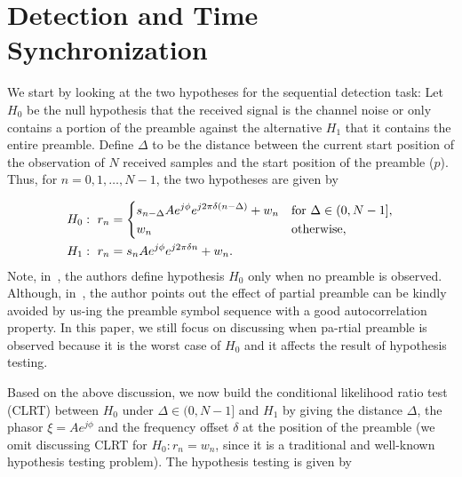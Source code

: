 \section{Detection and Time Synchronization}
\label{sec:detection}

We start by looking at the two hypotheses for the sequential detection task:
Let $H_0$ be the null hypothesis that the received signal is the channel noise or only contains a portion of the preamble against the alternative $H_1$ that it contains the entire preamble. 
Define $\Delta$ to be the distance between the current start position of the observation of $N$ received samples and the start position of the preamble ($p$). 
Thus, for $n=0,1,\ldots,N-1$, the two hypotheses are given by

\begin{equation}
    \label{eq:two hypotheses}
    \begin{aligned}
    &H_0:~r_n = 
    \begin{dcases}
        s_{n-\Delta}Ae^{j\phi}e^{j2\pi\delta (n-\Delta)}+w_n & \text{for}~\Delta\in(0,N-1], \\
        w_n & \text{otherwise},
    \end{dcases} \\
    &H_1:~r_n=s_nAe^{j\phi}e^{j2\pi\delta n}+w_n.
    \end{aligned}
  \end{equation}
Note, in~\cite{Ramakrishnan_10,Chiani_06,Liang_15},
the authors define hypothesis $H_0$ only when no preamble is observed.
Although, in~\cite{Chiani_06}, the author points out the effect of partial preamble
can be kindly avoided by us-ing the preamble symbol sequence with a good autocorrelation property.
In this paper, we still focus on discussing when pa-rtial preamble is observed because it is the worst case of $H_0$
and it affects the result of hypothesis testing.

Based on the above discussion, we now build the conditional likelihood ratio test (CLRT) 
between $H_0$ under $\Delta \in(0,N-1]$ and $H_1$ by giving the distance $\Delta$, the phasor $\xi=Ae^{j\phi}$ and
the frequency offset $\delta$ at the position of the preamble (we omit discussing CLRT for $H_0:r_n=w_n$, since it 
is a traditional and well-known hypothesis testing problem). The hypothesis testing is given by

